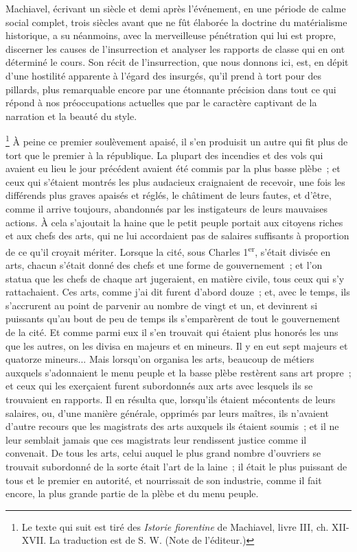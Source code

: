 \documentclass[french,twoside]{book} %
\newenvironment{quoteblock}%
  {\begin{quoting}}
  {\end{quoting}}
\newenvironment{quotebar}{%
    \def\FrameCommand{{\color{rubric!10!}\vrule width 0.5em} \hspace{0.9em}}%
    \def\OuterFrameSep{\itemsep} %
    \MakeFramed {\advance\hsize-\width \FrameRestore}
  }%
  {%
    \endMakeFramed
  }
\renewenvironment{quoteblock}%
  {%
    \savenotes
    \setstretch{0.9}
    \normalfont
    \begin{quotebar}
  }
  {%
    \end{quotebar}
    \spewnotes
  }
\begin{document}
Machiavel, écrivant un siècle et demi après l'événement, en une période de calme social complet, trois siècles avant que ne fût élaborée la doctrine du matérialisme historique, a su néanmoins, avec la merveilleuse pénétration qui lui est propre, discerner les causes de l'insurrection et analyser les rapports de classe qui en ont déterminé le cours. Son récit de l'insurrection, que nous donnons ici, est, en dépit d'une hostilité apparente à l'égard des insurgés, qu'il prend à tort pour des pillards, plus remarquable encore par une étonnante précision dans tout ce qui répond à nos préoccupations actuelles que par le caractère captivant de la narration et la beauté du style.\par

\begin{quoteblock}
 \noindent  \footnote{ Le texte qui suit est tiré des {\itshape Istorie fiorentine} de Machiavel, livre III, ch. XII-XVII. La traduction est de S. W. (Note de l'éditeur.)} À peine ce premier soulèvement apaisé, il s'en produisit un autre qui fit plus de tort que le premier à la république. La plupart des incendies et des vols qui avaient eu lieu le jour précédent avaient été commis par la plus basse plèbe ; et ceux qui s'étaient montrés les plus audacieux craignaient de recevoir, une fois les différends plus graves apaisés et réglés, le châtiment de leurs fautes, et d'être, comme il arrive toujours, abandonnés par les insti­gateurs de leurs mauvaises actions. À cela s'ajoutait la haine que le petit peuple portait aux citoyens riches et aux chefs des arts, qui ne lui accordaient pas de salaires suffisants à proportion de ce qu'il croyait mériter. Lorsque la cité, sous Charles 1\textsuperscript{er}, s'était divisée en arts, chacun s'était donné des chefs et une forme de gouvernement ; et l'on statua que les chefs de chaque art jugeraient, en matière civile, tous ceux qui s'y rattachaient. Ces arts, comme j'ai dit furent d'abord douze ; et, avec le temps, ils s'accrurent au point de parvenir au nombre de vingt et un, et devinrent si puissants qu'au bout de peu de temps ils s'emparèrent de tout le gouvernement de la cité. Et comme parmi eux il s'en trouvait qui étaient plus honorés les uns que les autres, on les divisa en majeurs et en mineurs. Il y en eut sept majeurs et quatorze mineurs... Mais lorsqu'on organisa les arts, beaucoup de métiers auxquels s'adonnaient le menu peuple et la basse plèbe restèrent sans art propre ; et ceux qui les exer­çaient furent subordonnés aux arts avec lesquels ils se trouvaient en rapports. Il en résulta que, lorsqu'ils étaient mécontents de leurs salaires, ou, d'une manière générale, opprimés par leurs maîtres, ils n'avaient d'autre recours que les magistrats des arts auxquels ils étaient soumis ; et il ne leur semblait jamais que ces magistrats leur rendissent justice comme il convenait. De tous les arts, celui auquel le plus grand nombre d'ouvriers se trouvait subordonné de la sorte était l'art de la laine ; il était le plus puissant de tous et le premier en autorité, et nourrissait de son industrie, comme il fait encore, la plus grande partie de la plèbe et du menu peuple. \par

\end{quoteblock}
\end{document}

